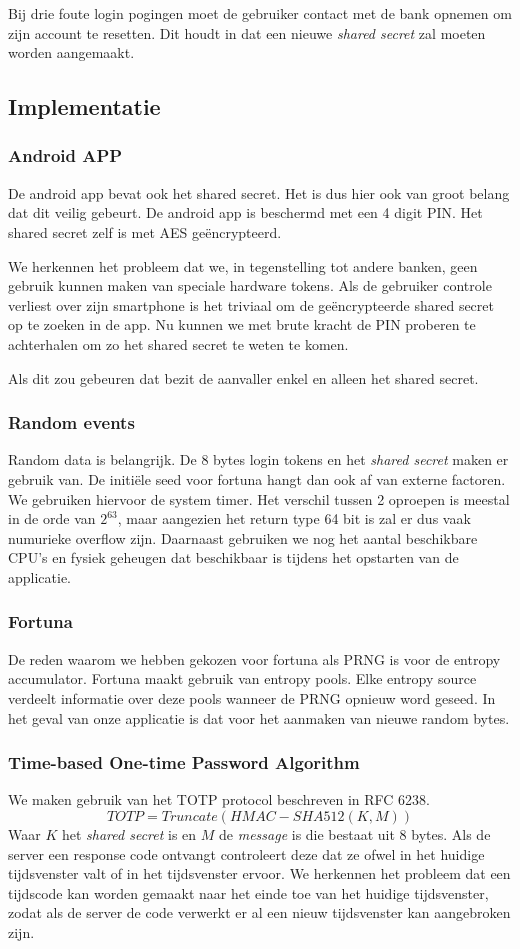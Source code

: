 \documentclass[11pt]{article}
\begin{document}
Bij drie foute login pogingen moet de gebruiker contact met de bank opnemen om zijn account te resetten. Dit houdt in dat een nieuwe \emph{shared secret} zal moeten worden aangemaakt.
\subsection{Implementatie}
\subsubsection{Android APP}
De android app bevat ook het shared secret. Het is dus hier ook van groot belang dat dit veilig gebeurt. 
De android app is beschermd met een 4 digit PIN. Het shared secret zelf is met AES ge\"encrypteerd. 

We herkennen het probleem dat we, in tegenstelling tot andere banken, geen gebruik kunnen maken van speciale hardware tokens. Als de gebruiker controle verliest over zijn smartphone is het triviaal om de ge\"encrypteerde shared secret op te zoeken in de app. Nu kunnen we met brute kracht de PIN proberen te achterhalen om zo het shared secret te weten te komen. 

Als dit zou gebeuren dat bezit de aanvaller enkel en alleen het shared secret.
\subsubsection{Random events}
Random data is belangrijk. De 8 bytes login tokens en het \emph{shared secret} maken er gebruik van.
De initi\"ele seed voor fortuna hangt dan ook af van externe factoren. We gebruiken hiervoor de system timer. Het verschil tussen 2 oproepen is meestal in de orde van $2^63$, maar aangezien het return type 64 bit is zal er dus vaak numurieke overflow zijn. Daarnaast gebruiken we nog het aantal beschikbare CPU's en fysiek geheugen dat beschikbaar is tijdens het opstarten van de applicatie.
\subsubsection{Fortuna}
\label{sec:fortuna}
De reden waarom we hebben gekozen voor fortuna als PRNG is voor de entropy accumulator. Fortuna maakt gebruik van entropy pools. Elke entropy source verdeelt informatie over deze pools wanneer de PRNG opnieuw word geseed. In het geval van onze applicatie is dat voor het aanmaken van nieuwe random bytes.

\subsubsection{Time-based One-time Password Algorithm}
\label{sec:totp}
We maken gebruik van het TOTP protocol beschreven in RFC 6238.
$$ TOTP = Truncate(HMAC-SHA512(K,M))$$
Waar $K$ het \emph{shared secret} is en $M$ de \emph{message} is die bestaat uit 8 bytes. Als de server een response code ontvangt controleert deze dat ze ofwel in het huidige tijdsvenster valt of in het tijdsvenster ervoor. We herkennen het probleem dat een tijdscode kan worden gemaakt naar het einde toe van het huidige tijdsvenster, zodat als de server de code verwerkt er al een nieuw tijdsvenster kan aangebroken zijn.\\
\end{document}
